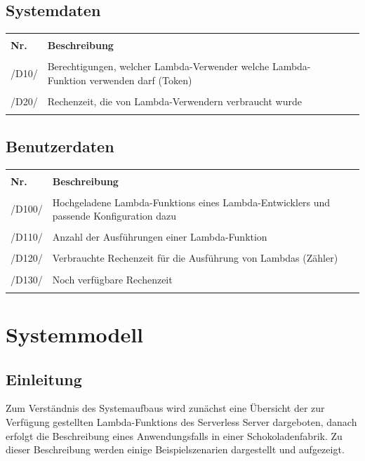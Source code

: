 \documentclass[a4paper,20pt,oneside]{book}
\begin{document}
\section{Systemdaten}
\begin{longtable}{lp{10cm}l}
\hline \\
\textbf{Nr.} &  \textbf{Beschreibung} \\ \hline\hline \\ \endhead
/D10/ & Berechtigungen, welcher \Gls{Lambda-Verwender} welche \Gls{Lambda-Funktion} verwenden darf (\gls{Token})\\ \hline \\
/D20/ & \Gls{Rechenzeit}, die von \Gls{Lambda-Verwender}n verbraucht wurde \\  \\
\hline
\hline
\end{longtable}
\section{Benutzerdaten}
\begin{longtable}{lp{10cm}l}
\hline \\
\textbf{Nr.} &  \textbf{Beschreibung} \\ \hline\hline \\ \endhead
/D100/ & Hochgeladene \Glspl{Lambda-Funktion} eines \Gls{Lambda-Entwickler}s und passende Konfiguration dazu\\ \hline \\
/D110/ & Anzahl der Ausführungen einer \Gls{Lambda-Funktion} \\ \hline \\
/D120/ & Verbrauchte \Gls{Rechenzeit} für die Ausführung von Lambdas (Zähler)\\  \hline \\
/D130/ & Noch verfügbare \Gls{Rechenzeit} \\ \\
\hline
\hline
\end{longtable}
\chapter{Systemmodell}


\section{Einleitung}
Zum Verständnis des Systemaufbaus wird zunächst eine Übersicht der zur Verfügung gestellten \glspl{Lambda-Funktion} des \gls{Serverless} Server dargeboten, danach erfolgt die Beschreibung eines Anwendungsfalls in einer Schokoladenfabrik.  Zu dieser Beschreibung werden einige Beispielszenarien dargestellt und aufgezeigt.
\end{document}
